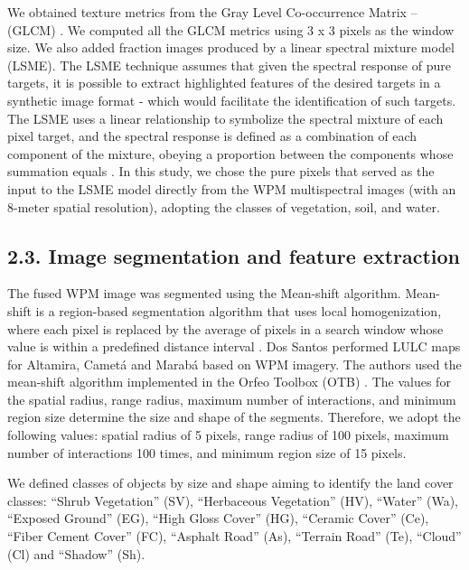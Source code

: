 \documentclass[preprint, 3p,
authoryear]{elsarticle} %
\begin{document}
We obtained texture metrics from the Gray Level Co-occurrence Matrix --
(GLCM) \citep{Haralick1973}. We computed all the GLCM metrics using 3 x
3 pixels as the window size. We also added fraction images produced by a
linear spectral mixture model (LSME). The LSME technique assumes that
given the spectral response of pure targets, it is possible to extract
highlighted features of the desired targets in a synthetic image format
- which would facilitate the identification of such targets. The LSME
uses a linear relationship to symbolize the spectral mixture of each
pixel target, and the spectral response is defined as a combination of
each component of the mixture, obeying a proportion between the
components whose summation equals \citep{Shimabukuro2019}. In this
study, we chose the pure pixels that served as the input to the LSME
model directly from the WPM multispectral images (with an 8-meter
spatial resolution), adopting the classes of vegetation, soil, and
water.

\hypertarget{image-segmentation-and-feature-extraction}{%
\subsection{2.3. Image segmentation and feature
extraction}\label{image-segmentation-and-feature-extraction}}

The fused WPM image was segmented using the Mean-shift algorithm.
Mean-shift is a region-based segmentation algorithm that uses local
homogenization, where each pixel is replaced by the average of pixels in
a search window whose value is within a predefined distance interval
\citep{Comaniciu1997}. Dos Santos performed LULC maps for Altamira,
Cametá and Marabá based on WPM imagery. The authors used the mean-shift
algorithm implemented in the Orfeo Toolbox (OTB) \citep{Grizonnet2017}.
The values for the spatial radius, range radius, maximum number of
interactions, and minimum region size determine the size and shape of
the segments. Therefore, we adopt the following values: spatial radius
of 5 pixels, range radius of 100 pixels, maximum number of interactions
100 times, and minimum region size of 15 pixels.

We defined classes of objects by size and shape aiming to identify the
land cover classes: ``Shrub Vegetation'' (SV), ``Herbaceous Vegetation''
(HV), ``Water'' (Wa), ``Exposed Ground'' (EG), ``High Gloss Cover''
(HG), ``Ceramic Cover'' (Ce), ``Fiber Cement Cover'' (FC), ``Asphalt
Road'' (As), ``Terrain Road'' (Te), ``Cloud'' (Cl) and ``Shadow'' (Sh).
\end{document}
